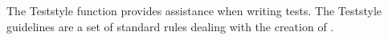 The Teststyle function provides assistance when writing tests. The Teststyle guidelines are a set of standard rules dealing with the creation of \gdsuites{}. 


